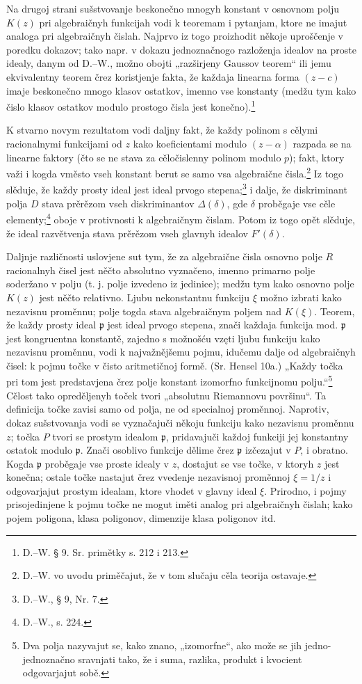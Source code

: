 \documentclass[11pt]{article}
\providecommand{\frp}{\mathfrak p}
\begin{document}
Na drugoj strani sušstvovanje beskonečno mnogyh konstant v osnovnom polju \(K(z)\) pri algebraičnyh funkcijah vodi k teoremam i pytanjam, ktore ne imajut analoga pri algebraičnyh čislah. Najprvo iz togo proizhodit někoje uproščenje v poredku dokazov; tako napr. v dokazu jednoznačnogo razloženja idealov na proste idealy, danym od D.--W., možno obojti „razširjeny Gaussov teorem“ ili jemu ekvivalentny teorem črez koristjenje fakta, že každaja linearna forma \((z-c)\) imaje beskonečno mnogo klasov ostatkov, imenno vse konstanty (medžu tym kako čislo klasov ostatkov modulo prostogo čisla jest konečno).\footnote{D.--W. § 9. Sr. primětky s. 212 i 213.}

K stvarno novym rezultatom vodi daljny fakt, že každy polinom s cělymi racionalnymi funkcijami od \(z\) kako koeficientami modulo \((z-\alpha)\) razpada se na linearne faktory (čto se ne stava za cěločislenny polinom modulo \(p\)); fakt, ktory važi i kogda vměsto vseh konstant berut se samo vsa algebraične čisla.\footnote{D.--W. vo uvodu priměčajut, že v tom slučaju cěla teorija ostavaje.} Iz togo slěduje, že každy prosty ideal jest ideal prvogo stepena;\footnote{D.--W., § 9, Nr. 7.} i dalje, že diskriminant polja \(D\) stava prěrězom vseh diskriminantov \(\Delta(\delta)\), gde \(\delta\) proběgaje vse cěle elementy;\footnote{D.--W., s. 224.} oboje v protivnosti k algebraičnym čislam. Potom iz togo opět slěduje, že ideal razvětvenja stava prěrězom vseh glavnyh idealov \(F'(\delta)\).

Daljnje različnosti uslovjene sut tym, že za algebraične čisla osnovno polje \(R\) racionalnyh čisel jest něčto absolutno vyznačeno, imenno primarno polje soderžano v polju (t. j. polje izvedeno iz jedinice); medžu tym kako osnovno polje \(K(z)\) jest něčto relativno. Ljubu nekonstantnu funkciju \(\xi\) možno izbrati kako nezavisnu proměnnu; polje togda stava algebraičnym poljem nad \(K(\xi)\). Teorem, že každy prosty ideal \(\frp\) jest ideal prvogo stepena, znači každaja funkcija mod. \(\frp\) jest kongruentna konstantě, zajedno s možnošću vzęti ljubu funkciju kako nezavisnu proměnnu, vodi k najvažnějšemu pojmu, idučemu dalje od algebraičnyh čisel: k pojmu točke v čisto aritmetičnoj formě. (Sr. Hensel 10a.) „Každy točka pri tom jest predstavjena črez polje konstant izomorfno funkcijnomu polju.“\footnote{Dva polja nazyvajut se, kako znano, „izomorfne“, ako može se jih jedno-jednoznačno sravnjati tako, že i suma, razlika, produkt i kvocient odgovarjajut sobě.} Cělost tako opreděljenyh toček tvori „absolutnu Riemannovu površinu“. Ta definicija točke zavisi samo od polja, ne od specialnoj proměnnoj. Naprotiv, dokaz sušstvovanja vodi se vyznačajuči někoju funkciju kako nezavisnu proměnnu \(z\); točka \(P\) tvori se prostym idealom \(\frp\), pridavajuči každoj funkciji jej konstantny ostatok modulo \(\frp\). Znači osoblivo funkcije dělime črez \(\frp\) izčezajut v \(P\), i obratno. Kogda \(\frp\) proběgaje vse proste idealy v \(z\), dostajut se vse točke, v ktoryh \(z\) jest konečna; ostale točke nastajut črez vvedenje nezavisnoj proměnnoj \(\xi=1/z\) i odgovarjajut prostym idealam, ktore vhodet v glavny ideal \(\xi\). Prirodno, i pojmy prisojedinjene k pojmu točke ne mogut iměti analog pri algebraičnyh čislah; kako pojem poligona, klasa poligonov, dimenzije klasa poligonov itd.
\end{document}
